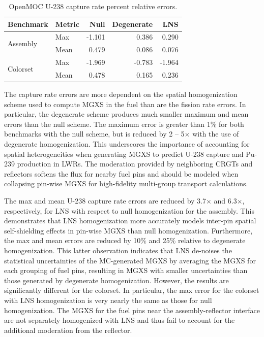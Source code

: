 \begin{table}[h!]
  \centering
  \caption{OpenMOC U-238 capture rate percent relative errors.}
  \label{tab:capt-errors} 
  \begin{tabular}{l l r r r}
  \toprule
  \textbf{Benchmark} & \textbf{Metric} & \textbf{Null} & \textbf{Degenerate} & \textbf{LNS} \\
  \midrule
  \multirow{2}{*}{Assembly} & Max  & -1.101 &  0.386 & 0.290 \\
                            & Mean &  0.479 &  0.086 & 0.076 \\
  \midrule
  \multirow{2}{*}{Colorset} & Max  & -1.969 & -0.783 & -1.964 \\
                            & Mean &  0.478 &  0.165 & 0.236 \\
  \bottomrule
\end{tabular}
\end{table}

The capture rate errors are more dependent on the spatial homogenization scheme used to compute MGXS in the fuel than are the fission rate errors. In particular, the degenerate scheme produces much smaller maximum and mean errors than the null scheme. The maximum error is greater than 1\% for both benchmarks with the null scheme, but is reduced by 2 -- 5$\times$ with the use of degenerate homogenization. This underscores the importance of accounting for spatial heterogeneities when generating MGXS to predict U-238 capture and Pu-239 production in LWRs. The moderation provided by neighboring CRGTs and reflectors softens the flux for nearby fuel pins and should be modeled when collapsing pin-wise MGXS for high-fidelity multi-group transport calculations.

The max and mean U-238 capture rate errors are reduced by 3.7$\times$ and 6.3$\times$, respectively, for LNS with respect to null homogenization for the assembly. This demonstrates that LNS homogenization more accurately models inter-pin spatial self-shielding effects in pin-wise MGXS than null homogenization. Furthermore, the max and mean errors are reduced by 10\% and 25\% relative to degenerate homogenization. This latter observation indicates that LNS de-noises the statistical uncertainties of the MC-generated MGXS by averaging the MGXS for each grouping of fuel pins, resulting in MGXS with smaller uncertainties than those generated by degenerate homogenization. However, the results are significantly different for the colorset. In particular, the max error for the colorset with LNS homogenization is very nearly the same as those for null homogenization. The MGXS for the fuel pins near the assembly-reflector interface are not separately homogenized with LNS and thus fail to account for the additional moderation from the reflector.

